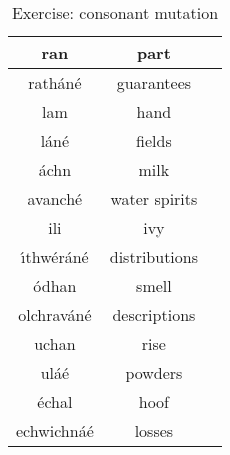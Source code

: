 \begin{table}[H]
{\begin{tabular}{|c|c|M{10.0cm}|}
  \midrule
  ran & part & \\
  \midrule
  rath\'{a}n\'{e} & guarantees & \\
  \midrule
  lam & hand & \\
  \midrule
  l\'{a}n\'{e} & fields & \\
  \midrule
  \'{a}chn & milk & \\
  \midrule
  avanch\'{e} & water spirits & \\
  \midrule
  ili & ivy & \\
  \midrule
  \'{\i}thw\'{e}r\'{a}n\'{e} & distributions & \\
  \midrule
  \'{o}dhan & smell & \\
  \midrule
  olchrav\'{a}n\'{e} & descriptions & \\
  \midrule
  uchan & rise & \\
  \midrule
  ul\'{a}\'{e} & powders & \\
  \midrule
  \'{e}chal & hoof & \\
  \midrule
  echwichn\'{a}\'{e} & losses & \\
  \bottomrule
\end{tabular}
}
\label{exercise_consonant_mutation}
\caption{Exercise: consonant mutation}
\end{table}

